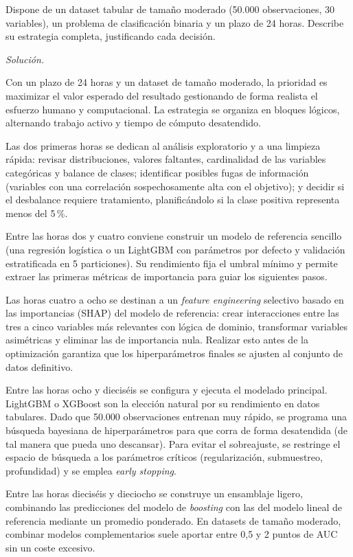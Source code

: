 \documentclass[12pt]{article}
\newcommand\sol[1]{\begin{mdframed}
\emph{Solución.} #1
\end{mdframed}}
\begin{document}
\begin{enumerate}
Dispone de un dataset tabular de tamaño moderado (50.000 observaciones, 30 variables), un problema
de clasificación binaria y un plazo de 24 horas. Describe su estrategia completa, justificando cada
decisión.

\sol{

Con un plazo de 24 horas y un dataset de tamaño moderado, la prioridad es maximizar el valor esperado
del resultado gestionando de forma realista el esfuerzo humano y computacional. La estrategia se organiza
en bloques lógicos, alternando trabajo activo y tiempo de cómputo desatendido.

\medskip
Las dos primeras horas se dedican al análisis exploratorio y a una limpieza rápida: revisar
distribuciones, valores faltantes, cardinalidad de las variables categóricas y balance de clases;
identificar posibles fugas de información (variables con una correlación sospechosamente alta con el
objetivo); y decidir si el desbalance requiere tratamiento, planificándolo si la clase positiva
representa menos del 5\,\%.

\medskip
Entre las horas dos y cuatro conviene construir un modelo de referencia sencillo (una regresión
logística o un LightGBM con parámetros por defecto y validación estratificada en 5 particiones).
Su rendimiento fija el umbral mínimo y permite extraer las primeras métricas de importancia para
guiar los siguientes pasos.

\medskip
Las horas cuatro a ocho se destinan a un \textit{feature engineering} selectivo basado en las
importancias (SHAP) del modelo de referencia: crear interacciones entre las tres a cinco variables
más relevantes con lógica de dominio, transformar variables asimétricas y eliminar las de importancia
nula. Realizar esto antes de la optimización garantiza que los hiperparámetros finales se ajusten
al conjunto de datos definitivo.

\medskip
Entre las horas ocho y dieciséis se configura y ejecuta el modelado principal. LightGBM o XGBoost
son la elección natural por su rendimiento en datos tabulares. Dado que 50.000 observaciones entrenan
muy rápido, se programa una búsqueda bayesiana de hiperparámetros para que corra de forma desatendida
(de tal manera que pueda uno descansar). Para evitar el sobreajuste, se restringe el espacio de búsqueda
a los parámetros críticos (regularización, submuestreo, profundidad) y se emplea \textit{early stopping}.

\medskip
Entre las horas dieciséis y dieciocho se construye un ensamblaje ligero, combinando las predicciones
del modelo de \textit{boosting} con las del modelo lineal de referencia mediante un promedio ponderado.
En datasets de tamaño moderado, combinar modelos complementarios suele aportar entre 0{,}5 y 2 puntos
de AUC sin un coste excesivo.

}
\end{enumerate}
\end{document}
